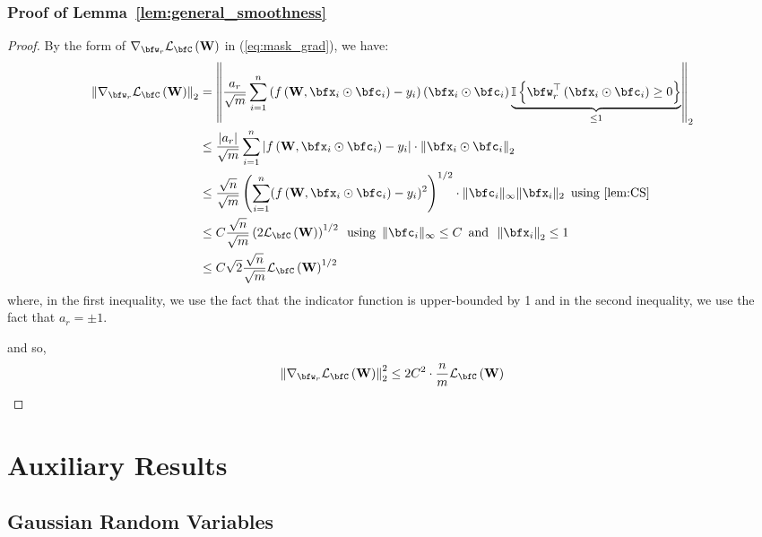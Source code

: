 \documentclass[10pt]{article} %
\theoremstyle{definition}
\theoremstyle{plain}
\newcommand{\paren}[1]{\left(#1\right)}
\newcommand{\norm}[1]{\left\|#1\right\|}
\newcommand{\indy}[1]{\mathbb{I}\left\{#1\right\}}
\def\calL{{\mathcal{L}}}
\begin{document}
\subsubsection{Proof of Lemma~\ref{lem:general_smoothness}}
\begin{proof}
    By the form of $\nabla_{\bfw_r}\calL_{\bfC}\paren{\mathbf{W}}$ in (\ref{eq:mask_grad}), we have:
    \begin{align*}
        \norm{\nabla_{\bfw_r}\calL_{\bfC}\paren{\mathbf{W}}}_2
        & =\norm{\frac{a_r}{\sqrt{m}}\sum_{i=1}^n\paren{f\paren{\mathbf{W},\bfx_i\odot\bfc_i} - y_i} \paren{\bfx_i\odot\bfc_i}\underbrace{\indy{\bfw_r^\top\paren{\bfx_i\odot\bfc_i}\geq 0}}_{\le 1}}_2 \\
        & \leq \frac{\left|a_r\right|}{\sqrt{m}}\sum_{i=1}^n\left|f\paren{\mathbf{W},\bfx_i\odot\bfc_i}-y_i\right|\cdot\norm{\bfx_i\odot\bfc_i}_2\\
        & \leq \frac{\sqrt{n}}{\sqrt{m}}\left(\sum_{i=1}^n (f\paren{\mathbf{W},\bfx_i\odot\bfc_i}-y_i)^2\right)^{1/2} \cdot \|\bfc_i\|_\infty \|\bfx_i\|_2 \enspace \text{using \ref{lem:CS}} \\
        & \leq C \frac{\sqrt{n}}{\sqrt{m}} \left(2\calL_{\bfC}\paren{\mathbf{W}}\right)^{1/2} \enspace \text{using} \enspace \|\bfc_i\|_\infty \le C \enspace \text{and} \enspace \norm{\bfx_i}_2\leq 1\\
        & \leq C\sqrt{2}\frac{\sqrt{n}}{\sqrt{m}}\calL_{\bfC}\paren{\mathbf{W}}^{1/2}
    \end{align*}
    where, in the first inequality, we use the fact that the indicator function is upper-bounded by 1 and in the second inequality, we use the fact that $a_r = \pm 1$.

    and so,
    \begin{align*}
        \norm{\nabla_{\bfw_r}\calL_{\bfC}\paren{\mathbf{W}}}^2_2\leq 2C^2\cdot \frac{n}{m}\calL_{\bfC}\paren{\mathbf{W}}
    \end{align*}
\end{proof}
\section{Auxiliary Results}
\subsection{Gaussian Random Variables}
\end{document}
